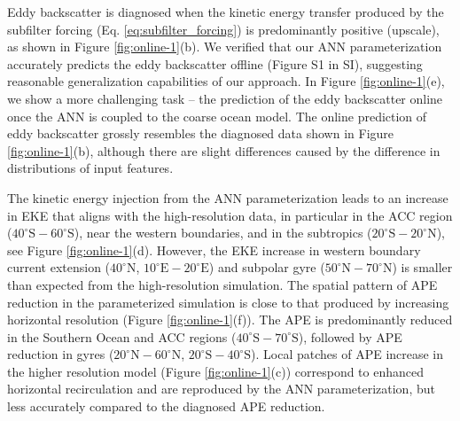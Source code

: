 \documentclass[draft]{agujournal2019}
\begin{document}
Eddy backscatter is diagnosed when the kinetic energy transfer produced by the subfilter forcing (Eq. \eqref{eq:subfilter_forcing}) is predominantly positive (upscale), as shown in Figure \ref{fig:online-1}(b).
We verified that our ANN parameterization accurately predicts the eddy backscatter offline (Figure S1 in SI), suggesting reasonable generalization capabilities of our approach. In Figure \ref{fig:online-1}(e), we show a more challenging task -- the prediction of the eddy backscatter online once the ANN is coupled to the coarse ocean model. The online prediction of eddy backscatter grossly resembles the diagnosed data shown in Figure \ref{fig:online-1}(b), although there are slight differences caused by the difference in distributions of input features.

The kinetic energy injection from the ANN parameterization leads to an increase in EKE that aligns with the high-resolution data, in particular in the ACC region ($40^\circ \mathrm{S}-60^\circ\mathrm{S}$), near the western boundaries, and in the subtropics ($20^\circ \mathrm{S}-20^\circ\mathrm{N}$), see Figure \ref{fig:online-1}(d). %
However, the EKE increase in western boundary current extension ($40^\circ\mathrm{N}$, $10^\circ\mathrm{E}-20^\circ\mathrm{E}$) and subpolar gyre ($50^\circ\mathrm{N}-70^\circ\mathrm{N}$) is smaller than expected from the high-resolution simulation. The spatial pattern of APE reduction in the parameterized simulation is close to that produced by increasing horizontal resolution (Figure \ref{fig:online-1}(f)). The APE is predominantly reduced in the Southern Ocean and ACC regions ($40^\circ \mathrm{S}-70^\circ\mathrm{S}$), followed by APE reduction in gyres ($20^\circ \mathrm{N}-60^\circ\mathrm{N}$, $20^\circ \mathrm{S}-40^\circ\mathrm{S}$). Local patches of  APE increase in the higher resolution model (Figure \ref{fig:online-1}(c)) correspond to enhanced horizontal recirculation and are reproduced by the ANN parameterization, but less accurately compared to the diagnosed APE reduction. %


%

%

%

%
\end{document}
